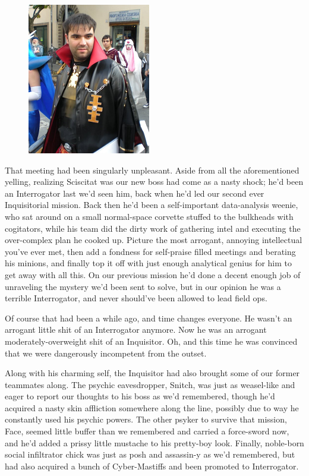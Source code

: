 \begin{figure}
	\begin{center}
		\includegraphics[width=\figwidth]{pics/17/14.png}
	\end{center}
\end{figure}
That meeting had been singularly unpleasant. 
Aside from all the aforementioned yelling, realizing Sciscitat was our new boss had come as a nasty shock; 
he'd been an Interrogator last we'd seen him, back when he'd led our second ever Inquisitorial mission. 
Back then he'd been a self-important data-analysis weenie, who sat around on a small normal-space corvette stuffed to the bulkheads with cogitators, while his team did the dirty work of gathering intel and executing the over-complex plan he cooked up. 
Picture the most arrogant, annoying intellectual you've ever met, then add a fondness for self-praise filled meetings and berating his minions, and finally top it off with just enough analytical genius for him to get away with all this. 
On our previous mission he'd done a decent enough job of unraveling the mystery we'd been sent to solve, but in our opinion he was a terrible Interrogator, and never should've been allowed to lead field ops.

Of course that had been a while ago, and time changes everyone. 
He wasn't an arrogant little shit of an Interrogator anymore. 
Now he was an arrogant moderately-overweight shit of an Inquisitor. 
Oh, and this time he was convinced that we were dangerously incompetent from the outset.

Along with his charming self, the Inquisitor had also brought some of our former teammates along. 
The psychic eavesdropper, Snitch, was just as weasel-like and eager to report our thoughts to his boss as we'd remembered, though he'd acquired a nasty skin affliction somewhere along the line, possibly due to way he constantly used his psychic powers. 
The other psyker to survive that mission, Face, seemed little buffer than we remembered and carried a force-sword now, and he'd added a prissy little mustache to his pretty-boy look. 
Finally, noble-born social infiltrator chick was just as posh and assassin-y as we'd remembered, but had also acquired a bunch of Cyber-Mastiffs and been promoted to Interrogator.

